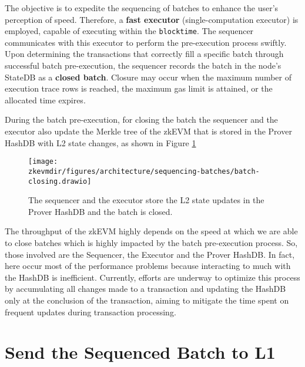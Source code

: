 The objective is to expedite the sequencing of batches to enhance the user's perception of speed. Therefore, a \textbf{fast executor} (single-computation executor) is employed, capable of executing within the \texttt{blocktime}. The sequencer communicates with this executor to perform the pre-execution process swiftly. Upon determining the transactions that correctly fill a specific batch through successful batch pre-execution, the sequencer records the batch in the node's StateDB as a \textbf{closed batch}. Closure may occur when the maximum number of execution trace rows is reached, the maximum gas limit is attained, or the allocated time expires.

During the batch pre-execution, for closing the batch the sequencer and the executor also update the Merkle tree of the zkEVM that is stored in the Prover HashDB with L2 state changes, as shown in Figure \ref{fig:close-batch}


\begin{figure}[H]
\centering
\texttt{[image: \\zkevmdir/figures/architecture/sequencing-batches/batch-closing.drawio]}
\caption{The sequencer and the executor store the L2 state updates in the Prover HashDB and the batch is closed.}
\label{fig:close-batch}
\end{figure} 

The throughput of the zkEVM highly depends on the speed at which we are able to close batches which is highly impacted by the batch pre-execution process. So, those involved are the Sequencer, the Executor and the Prover HashDB. In fact, here occur most of the performance problems because interacting to much with the HashDB is inefficient. Currently, efforts are underway to optimize this process by accumulating all changes made to a transaction and updating the HashDB only at the conclusion of the transaction, aiming to mitigate the time spent on frequent updates during transaction processing. 



\section{Send the Sequenced Batch to L1}

